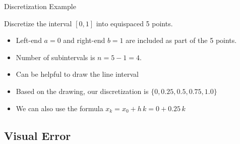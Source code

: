 \documentclass[10pt]{beamer}
\begin{document}
\begin{frame}{Discretization Example}

\begin{example}
    Discretize the interval $[0,1]$ into equispaced 5 points. 
\end{example}

\begin{itemize}
    \item Left-end $a=0$ and right-end $b=1$ are included as part of the 5 points.
    \item Number of subintervals is  $n=5-1=4$.
    \item Can be helpful to draw the line interval \\[7mm] 
\begin{center}    
\end{center}
    \item Based on the drawing, our discretization is $\{0, 0.25, 0.5, 0.75, 1.0\}$
    \item We can also use the formula $x_k= x_0 + h\,k=0 + 0.25\,k$

\end{itemize}
\end{frame}

\subsection{Visual Error}
\end{document}

